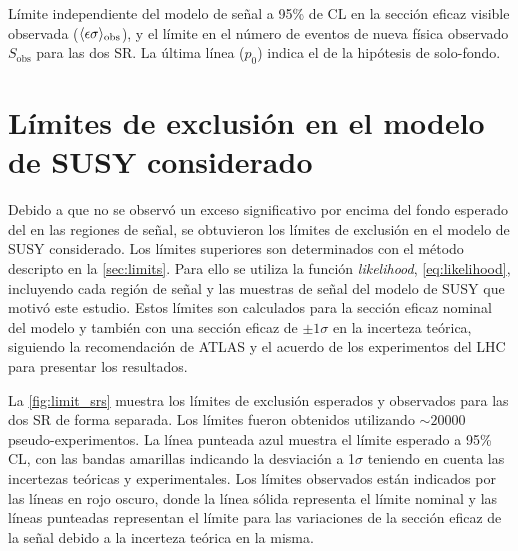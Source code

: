 \begin{table}[!htbp]
  \centering

  \caption{Límite independiente del modelo de señal a 95\% de CL en la
    sección eficaz visible observada ($\langle\epsilon{\rm \sigma}\rangle_{\rm obs}$),
    y el límite en el número de eventos de nueva física observado
    $S_\text{obs}$ para las dos SR.
    La última línea ($p_0$) indica el {\pvalue} de la hipótesis de solo-fondo.}
  \label{tab:upperlimits}

  

\end{table}


\clearpage


\section{Límites de exclusión en el modelo de SUSY considerado}
\label{sec:susy_limits}

Debido a que no se observó un exceso significativo por encima del fondo esperado
del {\SM} en las regiones de señal, se obtuvieron los límites de exclusión en el
modelo de SUSY considerado. Los límites superiores son determinados con el
método {\cls} descripto en la \cref{sec:limits}. Para ello se utiliza la función
\emph{likelihood}, \cref{eq:likelihood}, incluyendo cada región de señal y las muestras
de señal del modelo de SUSY que motivó este estudio.
Estos límites son
calculados para la sección eficaz nominal del modelo y también con una sección
eficaz de $\pm 1 \sigma$ en la incerteza teórica, siguiendo la recomendación de
ATLAS y el acuerdo de los experimentos del LHC para presentar los resultados.

La \cref{fig:limit_srs} muestra los límites de exclusión esperados y
observados para las dos SR de forma separada. Los límites fueron obtenidos
utilizando $\sim 20000$ pseudo-experimentos. La línea punteada azul muestra el
límite esperado a 95\% CL, con las bandas amarillas indicando la desviación a
1$\sigma$ teniendo en cuenta las incertezas teóricas y experimentales. Los
límites observados están indicados por las líneas en rojo oscuro, donde la línea
sólida representa el límite nominal y las líneas punteadas representan el límite
para las variaciones de la sección eficaz de la señal debido a la incerteza
teórica en la misma.

